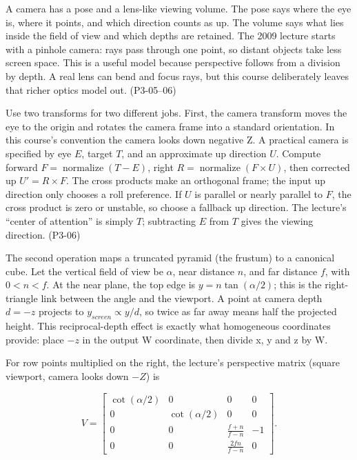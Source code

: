 A camera has a pose and a lens-like viewing volume. The pose says where the eye is, where it points, and which direction counts as up. The volume says what lies inside the field of view and which depths are retained. The 2009 lecture starts with a pinhole camera: rays pass through one point, so distant objects take less screen space. This is a useful model because perspective follows from a division by depth. A real lens can bend and focus rays, but this course deliberately leaves that richer optics model out. (P3-05--06)

Use two transforms for two different jobs. First, the camera transform moves the eye to the origin and rotates the camera frame into a standard orientation. In this course's convention the camera looks down negative Z. A practical camera is specified by eye \(E\), target \(T\), and an approximate up direction \(U\). Compute forward \(F=\operatorname{normalize}(T-E)\), right \(R=\operatorname{normalize}(F\times U)\), then corrected up \(U'=R\times F\). The cross products make an orthogonal frame; the input up direction only chooses a roll preference. If \(U\) is parallel or nearly parallel to \(F\), the cross product is zero or unstable, so choose a fallback up direction. The lecture's ``center of attention'' is simply \(T\); subtracting \(E\) from \(T\) gives the viewing direction. (P3-06)

The second operation maps a truncated pyramid (the frustum) to a canonical cube. Let the vertical field of view be \(\alpha\), near distance \(n\), and far distance \(f\), with \(0<n<f\). At the near plane, the top edge is \(y=n\tan(\alpha/2)\); this is the right-triangle link between the angle and the viewport. A point at camera depth \(d=-z\) projects to \(y_{screen}\propto y/d\), so twice as far away means half the projected height. This reciprocal-depth effect is exactly what homogeneous coordinates provide: place \(-z\) in the output W coordinate, then divide x, y and z by W.

For row points multiplied on the right, the lecture's perspective matrix (square viewport, camera looks down \(-Z\)) is

\[
V=\begin{bmatrix}
\cot(\alpha/2)&0&0&0\\
0&\cot(\alpha/2)&0&0\\
0&0&\frac{f+n}{f-n}&-1\\
0&0&\frac{2fn}{f-n}&0
\end{bmatrix}.
\]

